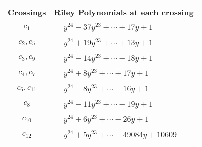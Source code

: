 \documentclass[1p]{elsarticle_modified}
\theoremstyle{definition}
\begin{document}
\begin{tabular}{m{50pt}|m{274pt}}
Crossings & \hspace{64pt}Riley Polynomials at each crossing \\
\hline $$\begin{aligned}c_{1}\end{aligned}$$&$\begin{aligned}
&y^{24}-37 y^{23}+\cdots+17 y+1
\end{aligned}$\\
\hline $$\begin{aligned}c_{2},c_{5}\end{aligned}$$&$\begin{aligned}
&y^{24}+19 y^{23}+\cdots+13 y+1
\end{aligned}$\\
\hline $$\begin{aligned}c_{3},c_{9}\end{aligned}$$&$\begin{aligned}
&y^{24}-14 y^{23}+\cdots-18 y+1
\end{aligned}$\\
\hline $$\begin{aligned}c_{4},c_{7}\end{aligned}$$&$\begin{aligned}
&y^{24}+8 y^{23}+\cdots+17 y+1
\end{aligned}$\\
\hline $$\begin{aligned}c_{6},c_{11}\end{aligned}$$&$\begin{aligned}
&y^{24}-8 y^{23}+\cdots-16 y+1
\end{aligned}$\\
\hline $$\begin{aligned}c_{8}\end{aligned}$$&$\begin{aligned}
&y^{24}-11 y^{23}+\cdots-19 y+1
\end{aligned}$\\
\hline $$\begin{aligned}c_{10}\end{aligned}$$&$\begin{aligned}
&y^{24}+6 y^{23}+\cdots-26 y+1
\end{aligned}$\\
\hline $$\begin{aligned}c_{12}\end{aligned}$$&$\begin{aligned}
&y^{24}+5 y^{23}+\cdots-49084 y+10609
\end{aligned}$\\
\hline
\end{tabular}\\~\\
\end{document}
